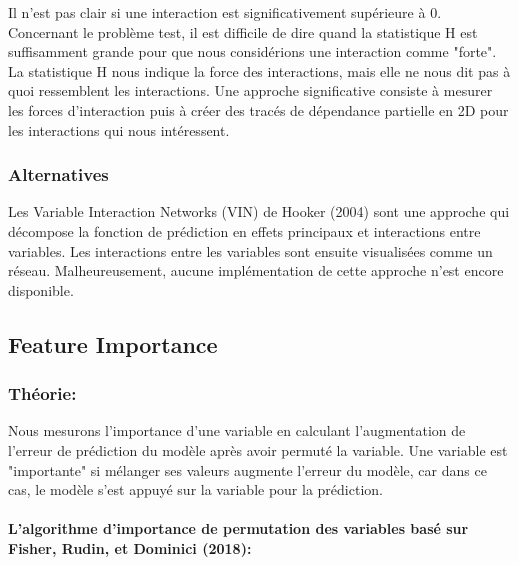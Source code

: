 Il n'est pas clair si une interaction est significativement supérieure à 0.
Concernant le problème test, il est difficile de dire quand la statistique H est suffisamment grande pour que nous considérions une interaction comme "forte".
La statistique H nous indique la force des interactions, mais elle ne nous dit pas à quoi ressemblent les interactions. Une approche significative consiste à mesurer les forces d'interaction puis à créer des tracés de dépendance partielle en 2D pour les interactions qui nous intéressent.

\subsubsection{Alternatives}
Les Variable Interaction Networks (VIN) de Hooker (2004) sont une approche qui décompose la fonction de prédiction en effets principaux et interactions entre variables. Les interactions entre les variables sont ensuite visualisées comme un réseau. Malheureusement, aucune implémentation de cette approche n'est encore disponible.



\subsection{Feature Importance}

\subsubsection{Théorie:}
Nous mesurons l'importance d'une variable en calculant l'augmentation de l'erreur de prédiction du modèle après avoir permuté la variable. Une variable est "importante" si mélanger ses valeurs augmente l'erreur du modèle, car dans ce cas, le modèle s'est appuyé sur la variable pour la prédiction.

\paragraph{L'algorithme d'importance de permutation des variables basé sur Fisher, Rudin, et Dominici (2018):}

